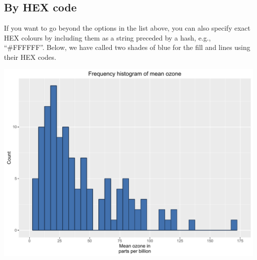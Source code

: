 \subsection{By HEX code}\label{by-hex-code}

If you want to go beyond the options in the list above, you can also
specify exact HEX colours by including them as a string preceded by a
hash, e.g., ``\#FFFFFF''. Below, we have called two shades of blue for
the fill and lines using their HEX codes.

\begin{Shaded}
\begin{Highlighting}[]

\StringTok{ }\NormalTok{(} \StringTok{ }
\StringTok{      }\NormalTok{(}\NormalTok{(}  \NormalTok{,}
\StringTok{        }  
\StringTok{      }\NormalTok{(} \NormalTok{,}
\StringTok{        } \NormalTok{(}\NormalTok{, }\NormalTok{, }\NormalTok{),}
\StringTok{        }\NormalTok{(}\NormalTok{, }\NormalTok{)) +}
\StringTok{      }\NormalTok{(} \NormalTok{) +}
\StringTok{      }\NormalTok{(}\NormalTok{)}
\end{Highlighting}
\end{Shaded}

\begin{center}\includegraphics[width=0.55\linewidth]{figures/histogram_10-1} \end{center}

